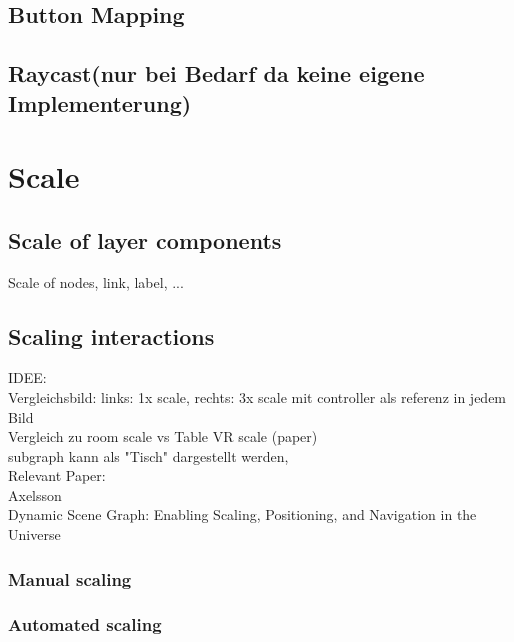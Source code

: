 \subsection{Button Mapping}
\subsection{Raycast(nur bei Bedarf da keine eigene Implementerung)}

\section{Scale}
\subsection{Scale of layer components}
Scale of nodes, link, label, ...
\subsection{Scaling interactions}

IDEE:\\
Vergleichsbild: links: 1x scale, rechts: 3x scale mit controller als referenz in jedem Bild\\
Vergleich zu room scale vs Table VR scale (paper)\\
subgraph kann als "Tisch" dargestellt werden, 
\\
Relevant Paper: \\
Axelsson\\
Dynamic Scene Graph: Enabling Scaling, Positioning, and Navigation in the Universe


\subsubsection{Manual scaling}
\subsubsection{Automated scaling}
